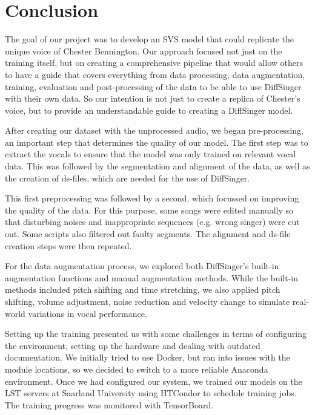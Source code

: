 \documentclass[a4paper]{article}
\begin{document}
	
	\newpage
	
	\section{Conclusion}
	
	The goal of our project was to develop an SVS model that could replicate the unique voice of Chester Bennington. Our approach focused not just on the training itself, but on creating a comprehensive pipeline that would allow others to have a guide that covers everything from data processing, data augmentation, training, evaluation and post-processing of the data to be able to use DiffSinger with their own data. So our intention is not just to create a replica of Chester's voice, but to provide an understandable guide to creating a DiffSinger model.
	
	After creating our dataset with the unprocessed audio, we began pre-processing, an important step that determines the quality of our model. The first step was to extract the vocals to ensure that the model was only trained on relevant vocal data. This was followed by the segmentation and alignment of the data, as well as the creation of ds-files, which are needed for the use of DiffSinger.
	
	This first preprocessing was followed by a second, which focussed on improving the quality of the data. For this purpose, some songs were edited manually so that disturbing noises and inappropriate sequences (e.g. wrong singer) were cut out. Some scripts also filtered out faulty segments. The alignment and ds-file creation steps were then repeated.
	
	For the data augmentation process, we explored both DiffSinger's built-in augmentation functions and manual augmentation methods. While the built-in methods included pitch shifting and time stretching, we also applied pitch shifting, volume adjustment, noise reduction and velocity change to simulate real-world variations in vocal performance.
	
	
	Setting up the training presented us with some challenges in terms of configuring the environment, setting up the hardware and dealing with outdated documentation. We initially tried to use Docker, but ran into issues with the module locations, so we decided to switch to a more reliable Anaconda environment. Once we had configured our system, we trained our models on the LST servers at Saarland University using HTCondor to schedule training jobs. The training progress was monitored with TensorBoard.
	
\end{document}

